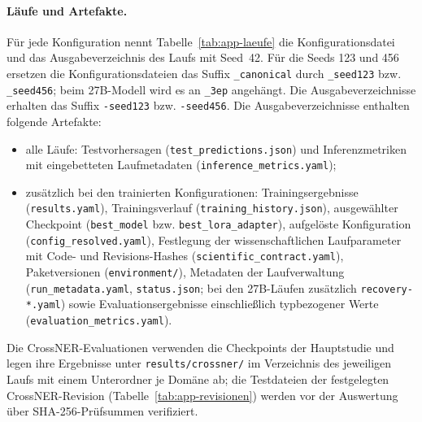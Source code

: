 \paragraph{Läufe und Artefakte.}
Für jede Konfiguration nennt Tabelle~\ref{tab:app-laeufe} die
Konfigurationsdatei und das Ausgabeverzeichnis des Laufs mit Seed~42.
Für die Seeds 123 und 456 ersetzen die Konfigurationsdateien das Suffix
\texttt{\_canonical} durch \texttt{\_seed123} bzw. \texttt{\_seed456};
beim 27B-Modell wird es an \texttt{\_3ep} angehängt.
Die Ausgabeverzeichnisse erhalten das Suffix \texttt{-seed123} bzw.
\texttt{-seed456}.
Die Ausgabeverzeichnisse enthalten folgende Artefakte:
{\raggedright
\begin{itemize}
    \item alle Läufe: Testvorhersagen
    (\texttt{test\_\allowbreak predictions.json}) und Inferenzmetriken mit
    eingebetteten Laufmetadaten (\texttt{inference\_\allowbreak metrics.yaml});
    \item zusätzlich bei den trainierten Konfigurationen:
    Trainingsergebnisse (\texttt{results.yaml}), Trainingsverlauf
    (\texttt{training\_\allowbreak history.json}), ausgewählter Checkpoint
    (\texttt{best\_\allowbreak model} bzw.
    \texttt{best\_\allowbreak lora\_\allowbreak adapter}), aufgelöste Konfiguration
    (\texttt{config\_\allowbreak resolved.yaml}), Festlegung der
    wissenschaftlichen Laufparameter mit Code- und Revisions-Hashes
    (\texttt{scientific\_\allowbreak contract.yaml}), Paketversionen
    (\texttt{environment/}), Metadaten der Laufverwaltung
    (\texttt{run\_\allowbreak metadata.yaml}, \texttt{status.json};
    bei den 27B-Läufen zusätzlich \texttt{recovery-*.yaml}) sowie
    Evaluationsergebnisse einschließlich typbezogener Werte
    (\texttt{evaluation\_\allowbreak metrics.yaml}).
\end{itemize}\par}
Die CrossNER-Evaluationen verwenden die Checkpoints der Hauptstudie und
legen ihre Ergebnisse unter \texttt{results/crossner/} im Verzeichnis des
jeweiligen Laufs mit einem Unterordner je Domäne ab; die Testdateien der
festgelegten CrossNER-Revision (Tabelle~\ref{tab:app-revisionen}) werden
vor der Auswertung über SHA-256-Prüfsummen verifiziert.

